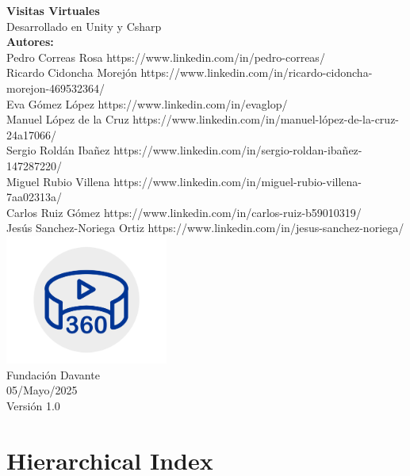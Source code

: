 \documentclass[12pt]{article}
\newcommand{\+}{\discretionary{\mbox{\scriptsize$\hookleftarrow$}}{}{}}
\begin{document}
\begin{titlepage}
    \vspace*{0.1cm}
    \begin{center}
        {\fontsize{24pt}{28pt}\selectfont\textbf{Visitas Virtuales}} \\[0.1cm]
        {\Large Desarrollado en Unity y Csharp} \\[0.2cm]
        {\large \textbf{Autores:}} \\[0.5cm]
        {\large Pedro Correas Rosa    https://www.linkedin.com/in/pedro-correas/} \\[0.5cm]
        {\large Ricardo Cidoncha Morejón    https://www.linkedin.com/in/ricardo-cidoncha-morejon-469532364/} \\[0.5cm]
        {\large Eva Gómez López    https://www.linkedin.com/in/evaglop/} \\[0.5cm]
        {\large Manuel López de la Cruz    https://www.linkedin.com/in/manuel-lópez-de-la-cruz-24a17066/} \\[0.5cm]
        {\large Sergio Roldán Ibañez    https://www.linkedin.com/in/sergio-roldan-ibañez-147287220/} \\[0.5cm]
        {\large Miguel Rubio Villena    https://www.linkedin.com/in/miguel-rubio-villena-7aa02313a/} \\[0.5cm]
        {\large Carlos Ruiz Gómez    https://www.linkedin.com/in/carlos-ruiz-b59010319/} \\[0.5cm]
        {\large Jesús Sanchez-Noriega Ortiz    https://www.linkedin.com/in/jesus-sanchez-noriega/} \\[0.5cm]
        \includegraphics[width=0.4\textwidth]{logo} \\[0.2cm]
        {\large Fundación Davante} \\[0.2cm]
        {\large 05/Mayo/2025} \\[0.2cm]
        {\large Versión 1.0} \\[0.2cm]
        

    \end{center}
\end{titlepage}
\chapter{Hierarchical Index}

\end{document}
